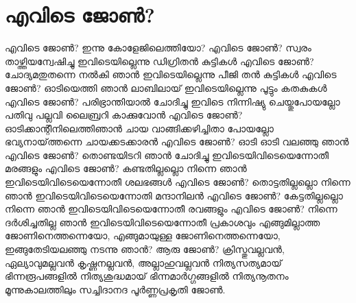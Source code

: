 \section{എവിടെ ജോൺ?}
\obeylines
\noindent
എവിടെ ജോൺ?
ഇന്നു കോളേജിലെത്തിയോ? 
എവിടെ ജോൺ? 
സ്വരം താഴ്ത്തിയന്വേഷിച്ചു 
ഇവിടെയില്ലെന്നു ഡിഗ്രിതൻ കുട്ടികൾ 
എവിടെ  ജോൺ?  
ചോദ്യമതുതന്നെ നൽകി ഞാൻ 
ഇവിടെയില്ലെന്നു പീജി തൻ കുട്ടികൾ 
എവിടെ ജോൺ? 
ഓടിയെത്തി ഞാൻ ലാബിലായ് 
ഇവിടെയില്ലെന്നു പൂട്ടും കതകുകൾ 
എവിടെ ജോൺ? 
പരിഭ്രാന്തിയാൽ ചോദിച്ചു 
ഇവിടെ നിന്നിഷ്യു ചെയ്തുപോയല്ലോ 
പതിവു പല്ലവി ലൈബ്രറി കാക്കുവോൻ 
എവിടെ ജോൺ? 
ഓടിക്കാന്റീനിലെത്തിഞാൻ 
ചായ വാങ്ങിക്കഴിച്ചിതാ പോയല്ലോ 
ഭവ്യനായ്‌ത്തന്നെ ചായക്കടക്കാരൻ 
എവിടെ ജോൺ? 
ഓടി ഓടി വലഞ്ഞു ഞാൻ 
എവിടെ ജോൺ? 
തൊണ്ടയിടറി ഞാൻ ചോദിച്ചു 
ഇവിടെയിവിടെയെന്നോതീ മരങ്ങളും 
എവിടെ ജോൺ? 
കണ്ടതില്ലല്ലൊ നിന്നെ ഞാൻ 
ഇവിടെയിവിടെയെന്നോതീ ശലഭങ്ങൾ 
എവിടെ ജോൺ? 
തൊട്ടതില്ലല്ലൊ നിന്നെ ഞാൻ 
ഇവിടെയിവിടെയെന്നോതി മന്ദാനിലൻ 
എവിടെ ജോൺ? 
കേട്ടതില്ലല്ലൊ നിന്നെ ഞാൻ 
ഇവിടെയിവിടെയെന്നോതീ രവങ്ങളും  
എവിടെ ജോൺ? 
നിന്നെ ദർശിച്ചതില്ല ഞാൻ 
ഇവിടെയിവിടെയെന്നോതീ പ്രകാശവും 
എങ്ങുമില്ലാത്ത ജോണിനെത്തന്നെയോ,
എങ്ങുമായുള്ള ജോണിനെത്തന്നെയോ,
ഇങ്ങുതേടിയലഞ്ഞു നടന്നു ഞാൻ?
ആരു ജോൺ? 
ക്രിസ്തുവല്ലവൻ, ഏല്യാവുമല്ലവൻ 
കൃഷ്ണനല്ലവൻ, അല്ലാഹുവല്ലവൻ 
നിത്യസത്യമായ് ഭിന്നരൂപങ്ങളിൽ 
നിത്യശുദ്ധമായ് ഭിന്നമാർഗ്ഗങ്ങളിൽ 
നിത്യനൂതനം മൂന്നുകാലത്തിലും 
സച്ചിദാനദ പൂർണ്ണപ്രകൃതി ജോൺ.
